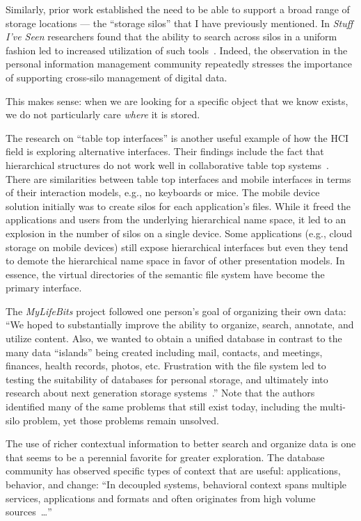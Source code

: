 Similarly, prior work established the need to be able to support a broad
range of storage locations --- the ``storage silos'' that I have previously
mentioned.  In \emph{Stuff I've Seen} researchers found that the ability to
search across silos in a uniform fashion led to increased
utilization of such tools~\cite{dumais2003stuff}. Indeed, the observation in the
personal information management community repeatedly stresses the importance of
supporting cross-silo management of digital data.

This makes sense: when we are looking for a specific object that we know exists,
we do not particularly care \emph{where} it is stored.

The research on ``table top interfaces'' is another useful example of how the
HCI field is exploring alternative interfaces.  Their findings include the fact
that hierarchical structures do not work well in collaborative table top
systems~\cite{collins2007tabletop}.  There are similarities between table
top interfaces and mobile interfaces in terms of their interaction models, e.g.,
no keyboards or mice.  The mobile device solution initially was to create silos
for each application's files. While it freed the applications and users from the
underlying hierarchical name space, it led to an explosion in the number of
silos on a single device.  Some applications (e.g., cloud storage on mobile
devices) still expose hierarchical interfaces but even they tend to demote the
hierarchical name space in favor of other presentation models.  In essence, the
virtual directories of the semantic file system have become the primary
interface.

The \emph{MyLifeBits} project followed one person's goal of organizing their
own data: ``We hoped to substantially improve the ability to organize, search,
annotate, and utilize content. Also, we wanted to obtain a unified database in
contrast to the many data “islands” being created including mail, contacts, and
meetings, finances, health records, photos, etc. Frustration with the file
system led to testing the suitability of databases for personal storage, and
ultimately into research about next generation storage
systems~\cite{gemmell2002mylifebits}.'' Note that the authors
identified many of the same problems that still exist today, including the
multi-silo problem, yet those problems remain unsolved.

The use of richer contextual information to better search and organize data is
one that seems to be a perennial favorite for greater exploration.  The database
community has observed specific types of context that are useful: applications,
behavior, and change:  ``In decoupled systems, behavioral context spans multiple
services, applications and formats and often originates from high volume
sources~\cite{hellerstein2017ground}\ldots''


